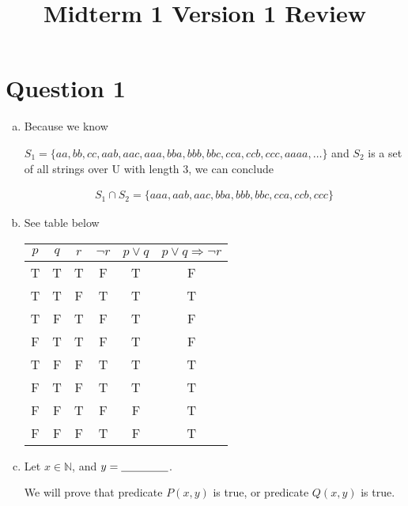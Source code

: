 \documentclass[12pt]{article}
\begin{document}
\title{Midterm 1 Version 1 Review}
\maketitle

\section*{Question 1}
\begin{enumerate}[a.]
    \item

    Because we know

    $S_1 = \{ aa,bb,cc,aab,aac,aaa,bba,bbb,bbc,cca,ccb,ccc,aaaa,\dots \}$
    and $S_2$ is a set of all strings over U with length 3, we can conclude

    \begin{align*}
        S_1 \cap S_2 = \{aaa,aab,aac,bba,bbb,bbc,cca,ccb,ccc\}
    \end{align*}

    \item

    See table below

    \begin{tabular}{|c|c|c|c|c|c|}
        \hline
        $p$ & $q$ & $r$ & $\neg r$ & $p \lor q$ & $p \lor q \Rightarrow \neg r$\\
        \hline
        T & T & T & F & T & F\\
        \hline
        T & T & F & T & T & T\\
        \hline
        T & F & T & F & T & F\\
        \hline
        F & T & T & F & T & F\\
        \hline
        T & F & F & T & T & T\\
        \hline
        F & T & F & T & T & T\\
        \hline
        F & F & T & F & F & T\\
        \hline
        F & F & F & T & F & T\\
        \hline
    \end{tabular}

    \item

    Let $x \in \mathbb{N}$, and $y = \underline{\hspace{1.5cm}}$.

    \bigskip

    We will prove that predicate $P(x,y)$ is true, or predicate $Q(x,y)$ is
    true.


\end{enumerate}
\end{document}
